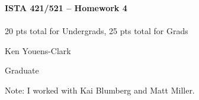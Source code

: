 \documentclass[10pt]{article}
\begin{document}
\begin{center}
    {\Large {\bf ISTA 421/521 -- Homework 4}} \\
     \\
    20 pts total for Undergrads, 25 pts total for Grads\\
    
\end{center}

\begin{flushright}
Ken Youens-Clark

Graduate
\end{flushright}

\vspace{1cm}

Note: I worked with Kai Blumberg and Matt Miller.

\end{document}

